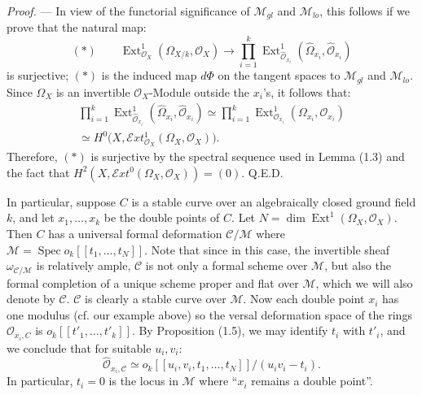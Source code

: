 \documentclass[10pt]{article}
\newcommand{\Spec}{\operatorname{Spec}}
\newcommand{\Ext}{\operatorname{Ext}}
\newcommand{\cO}{\mathcal O}
\newcommand{\cM}{\mathcal M}
\newcommand{\cC}{\mathcal C}
\newcommand{\QED}{\hfill Q.E.D.}
\begin{document}
\noindent\emph{Proof.} --- In view of the functorial significance of $\cM_{gl}$ and $\cM_{lo}$, this follows if we prove that the natural map:
\[
(*)\qquad \Ext^1_{\cO_X}(\Omega_{X/k},\cO_X)\longrightarrow \prod_{i=1}^{k}\Ext^1_{\widehat{\cO}_{x_i}}(\widehat{\Omega}_{x_i},\widehat{\cO}_{x_i})
\]
is surjective; $(*)$ is the induced map $d\Phi$ on the tangent spaces to $\cM_{gl}$ and $\cM_{lo}$. Since $\Omega_X$ is an invertible $\cO_X$-Module outside the $x_i$'s, it follows that:
\[
\begin{gathered}
\prod_{i=1}^{k}\Ext^1_{\widehat{\cO}_{x_i}}(\widehat{\Omega}_{x_i},\widehat{\cO}_{x_i})
\simeq\prod_{i=1}^{k}\Ext^1_{\cO_{x_i}}(\Omega_{x_i},\cO_{x_i})\\
\simeq H^0\bigl(X,\mathcal{E}xt^1_{\cO_X}(\Omega_X,\cO_X)\bigr).
\end{gathered}
\]
Therefore, $(*)$ is surjective by the spectral sequence used in Lemma (1.3) and the fact that $H^2(X,\mathcal{E}xt^0(\Omega_X,\cO_X))=(0)$. \QED

In particular, suppose $C$ is a stable curve over an algebraically closed ground field $k$, and let $x_1,\ldots,x_k$ be the double points of $C$. Let $N=\dim\Ext^1(\Omega_X,\cO_X)$. Then $C$ has a universal formal deformation $\cC/\cM$ where $\cM=\Spec o_k[[t_1,\ldots,t_N]]$. Note that since in this case, the invertible sheaf $\omega_{\cC/\cM}$ is relatively ample, $\cC$ is not only a formal scheme over $\cM$, but also the formal completion of a unique scheme proper and flat over $\cM$, which we will also denote by $\cC$. $\cC$ is clearly a stable curve over $\cM$. Now each double point $x_i$ has one modulus (cf. our example above) so the versal deformation space of the rings $\cO_{x_i,C}$ is $o_k[[t'_1,\ldots,t'_k]]$. By Proposition (1.5), we may identify $t_i$ with $t'_i$, and we conclude that for suitable $u_i,v_i$:
\[
\widehat{\cO}_{x_i,\cC}\simeq o_k[[u_i,v_i,t_1,\ldots,t_N]]/(u_i v_i-t_i).
\]
In particular, $t_i=0$ is the locus in $\cM$ where ``$x_i$ remains a double point''.
\end{document}
